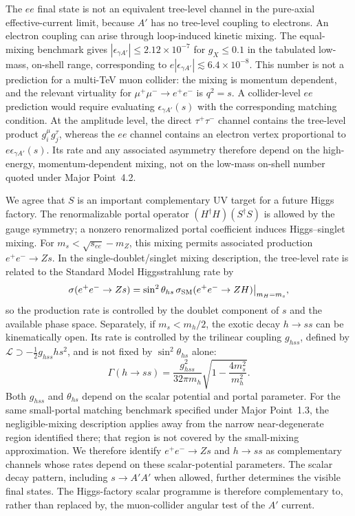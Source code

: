 \documentclass[12pt,a4paper]{article}
\begin{document}
The \(ee\) final state is not an equivalent tree-level channel in the pure-axial effective-current limit, because \(A'\) has no tree-level coupling to electrons. An electron coupling can arise through loop-induced kinetic mixing. The equal-mixing benchmark gives \(|\epsilon_{\gamma A'}|\leq2.12\times10^{-7}\) for \(g_X\leq0.1\) in the tabulated low-mass, on-shell range, corresponding to \(e|\epsilon_{\gamma A'}|\lesssim6.4\times10^{-8}\). This number is not a prediction for a multi-TeV muon collider: the mixing is momentum dependent, and the relevant virtuality for \(\mu^+\mu^-\to e^+e^-\) is \(q^2=s\). A collider-level \(ee\) prediction would require evaluating \(\epsilon_{\gamma A'}(s)\) with the corresponding matching condition. At the amplitude level, the direct \(\tau^+\tau^-\) channel contains the tree-level product \(g_i^\mu g_j^\tau\), whereas the \(ee\) channel contains an electron vertex proportional to \(e\epsilon_{\gamma A'}(s)\). Its rate and any associated asymmetry therefore depend on the high-energy, momentum-dependent mixing, not on the low-mass on-shell number quoted under Major Point~4.2.

We agree that \(S\) is an important complementary UV target for a future Higgs factory. The renormalizable portal operator \((H^\dagger H)(S^\dagger S)\) is allowed by the gauge symmetry; a nonzero renormalized portal coefficient induces Higgs--singlet mixing. For \(m_s<\sqrt{s_{ee}}-m_Z\), this mixing permits associated production \(e^+e^-\to Zs\). In the single-doublet/singlet mixing description, the tree-level rate is related to the Standard Model Higgsstrahlung rate by
\[
\sigma(e^+e^-\to Zs)
=\sin^2\theta_{hs}\,
\sigma_{\rm SM}(e^+e^-\to ZH)\big|_{m_H=m_s},
\]
so the production rate is controlled by the doublet component of \(s\) and the available phase space. Separately, if \(m_s<m_h/2\), the exotic decay \(h\to ss\) can be kinematically open. Its rate is controlled by the trilinear coupling \(g_{hss}\), defined by \(\mathcal L\supset-\tfrac12g_{hss}h s^2\), and is not fixed by \(\sin^2\theta_{hs}\) alone:
\[
\Gamma(h\to ss)=\frac{g_{hss}^2}{32\pi m_h}
\sqrt{1-\frac{4m_s^2}{m_h^2}}.
\]
Both \(g_{hss}\) and \(\theta_{hs}\) depend on the scalar potential and portal parameter. For the same small-portal matching benchmark specified under Major Point~1.3, the negligible-mixing description applies away from the narrow near-degenerate region identified there; that region is not covered by the small-mixing approximation. We therefore identify \(e^+e^-\to Zs\) and \(h\to ss\) as complementary channels whose rates depend on these scalar-potential parameters. The scalar decay pattern, including \(s\to A'A'\) when allowed, further determines the visible final states. The Higgs-factory scalar programme is therefore complementary to, rather than replaced by, the muon-collider angular test of the \(A'\) current.
\end{document}
